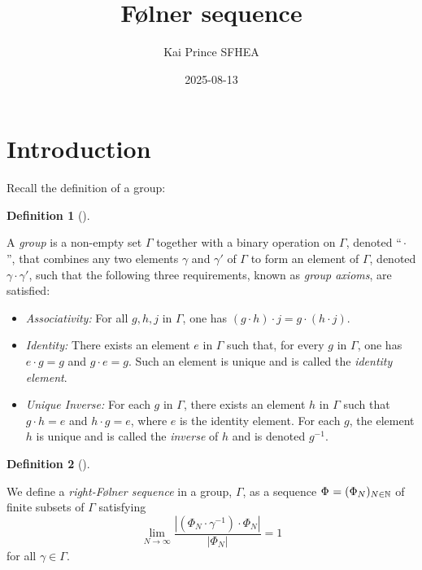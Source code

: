 \documentclass[
  british,
]{article}
\title{Følner sequence}
\author{Kai Prince SFHEA}
\date{2025-08-13}
\providecommand{\tightlist}{%
  \setlength{\itemsep}{0pt}\setlength{\parskip}{0pt}}
\theoremstyle{definition}
\newtheorem{definition}{Definition}[section]
\theoremstyle{plain}
\theoremstyle{remark}
\newcommand{\GroupOperation}[2]{{#1}\cdot{#2}}
\newcommand{\Group}{{\Gamma}}
\newcommand{\Folner}[1][\vphantom{}]{{\Phi}_{#1}}
\newcommand{\GroupElement}{{\gamma}}
\newcommand{\Identity}{{e}}
\newcommand{\Inverse}[1]{{#1}^{-1}}
\begin{document}
\maketitle


\section{Introduction}\label{introduction}

Recall the definition of a group:

\begin{definition}[]\protect\hypertarget{def-group-recall}{}\label{def-group-recall}

A \emph{group} is a non-empty set \(\Group\) together with a binary
operation on \(\Group\), denoted ``\(\GroupOperation{}{}\)'', that
combines any two elements \(\GroupElement\) and \(\GroupElement'\) of
\(\Group\) to form an element of \(\Group\), denoted
\(\GroupOperation{\GroupElement}{\GroupElement'}\), such that the
following three requirements, known as \emph{group axioms}, are
satisfied:

\begin{itemize}
\tightlist
\item
  \emph{Associativity:} For all \({g},{h},{j}\) in \(\Group\), one has
  \(\GroupOperation{(\GroupOperation{g}{h})}{j}=\GroupOperation{g}{(\GroupOperation{h}{j})}\).
\item
  \emph{Identity:} There exists an element \(\Identity\) in \(\Group\)
  such that, for every \({g}\) in \(\Group\), one has
  \(\GroupOperation{\Identity}{g}={g}\) and
  \(\GroupOperation{g}{\Identity}={g}\). Such an element is unique and
  is called the \emph{identity element}.
\item
  \emph{Unique Inverse:} For each \({g}\) in \(\Group\), there exists an
  element \({h}\) in \(\Group\) such that
  \(\GroupOperation{g}{h}=\Identity\) and
  \(\GroupOperation{h}{g}=\Identity\), where \(\Identity\) is the
  identity element. For each \({g}\), the element \({h}\) is unique and
  is called the \emph{inverse} of \({h}\) and is denoted
  \(\Inverse{g}\).
\end{itemize}

\end{definition}

\begin{definition}[]\protect\hypertarget{def-rightFolner}{}\label{def-rightFolner}

We define a \emph{right-Følner sequence} in a group, \(\Group\), as a
sequence \(\Folner =(\Folner[N])_{N\in\mathbb{N}}\) of finite subsets of
\(\Gamma\) satisfying
\[\lim_{N\rightarrow\infty}\frac{|\GroupOperation{(\GroupOperation{\Folner[N]}{\Inverse{\GroupElement}})}{\Folner[N]}|}{|\Folner[N]|}=1\]for
all \(\GroupElement\in\Group\).

\end{definition}
\end{document}
